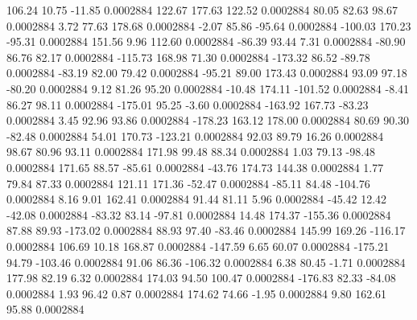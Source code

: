       106.24       10.75      -11.85     0.0002884
      122.67      177.63      122.52     0.0002884
       80.05       82.63       98.67     0.0002884
        3.72       77.63      178.68     0.0002884
       -2.07       85.86      -95.64     0.0002884
     -100.03      170.23      -95.31     0.0002884
      151.56        9.96      112.60     0.0002884
      -86.39       93.44        7.31     0.0002884
      -80.90       86.76       82.17     0.0002884
     -115.73      168.98       71.30     0.0002884
     -173.32       86.52      -89.78     0.0002884
      -83.19       82.00       79.42     0.0002884
      -95.21       89.00      173.43     0.0002884
       93.09       97.18      -80.20     0.0002884
        9.12       81.26       95.20     0.0002884
      -10.48      174.11     -101.52     0.0002884
       -8.41       86.27       98.11     0.0002884
     -175.01       95.25       -3.60     0.0002884
     -163.92      167.73      -83.23     0.0002884
        3.45       92.96       93.86     0.0002884
     -178.23      163.12      178.00     0.0002884
       80.69       90.30      -82.48     0.0002884
       54.01      170.73     -123.21     0.0002884
       92.03       89.79       16.26     0.0002884
       98.67       80.96       93.11     0.0002884
      171.98       99.48       88.34     0.0002884
        1.03       79.13      -98.48     0.0002884
      171.65       88.57      -85.61     0.0002884
      -43.76      174.73      144.38     0.0002884
        1.77       79.84       87.33     0.0002884
      121.11      171.36      -52.47     0.0002884
      -85.11       84.48     -104.76     0.0002884
        8.16        9.01      162.41     0.0002884
       91.44       81.11        5.96     0.0002884
      -45.42       12.42      -42.08     0.0002884
      -83.32       83.14      -97.81     0.0002884
       14.48      174.37     -155.36     0.0002884
       87.88       89.93     -173.02     0.0002884
       88.93       97.40      -83.46     0.0002884
      145.99      169.26     -116.17     0.0002884
      106.69       10.18      168.87     0.0002884
     -147.59        6.65       60.07     0.0002884
     -175.21       94.79     -103.46     0.0002884
       91.06       86.36     -106.32     0.0002884
        6.38       80.45       -1.71     0.0002884
      177.98       82.19        6.32     0.0002884
      174.03       94.50      100.47     0.0002884
     -176.83       82.33      -84.08     0.0002884
        1.93       96.42        0.87     0.0002884
      174.62       74.66       -1.95     0.0002884
        9.80      162.61       95.88     0.0002884
